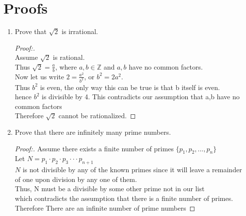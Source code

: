 \documentclass[11pt]{article}
\begin{document}
\section*{Proofs}
\begin{enumerate}
    \item Prove that $\sqrt{2}$ is irrational.
        \begin{proof}[Proof:\nopunct] \\ 
             Assume $\sqrt{2}$ is rational. 
             \\ Thus $\sqrt{2} = \frac{a}{b}$, where $a,b \in \mathbb{Z}$ and $a,b$ have no common factors.
             \\ Now let us write $2 = \frac{a^2}{b^2}$, or $b^2=2a^2$.
             \\ Thus $b^2$ is even, the only way this can be true is that b itself is even.
             \\ hence $b^2$ is divisible by 4. This contradicts our assumption that a,b have no common factors
             \\ Therefore $\sqrt{2}$ cannot be rationalized.
        \end{proof}
        
    \item Prove that there are infinitely many prime numbers.
        \begin{proof}[Proof:\nopunct]
            Assume there exists a finite number of primes $\{p_1, p_2, ... , p_n \}$ 
            \\ Let $N = p_1\cdot p_2 \cdot p_3 \cdot \cdot \cdot p_{n+1}$
            \\ $N$ is not divisible by any of the known primes since it will leave a remainder of one upon division by any one of them.
            \\ Thus, N must be a divisible by some other prime not in our list
            \\ which contradicts the assumption that there is a finite number of primes.
            \\ Therefore There are an infinite number of prime numbers
        \end{proof}
        

\end{enumerate}
\end{document}
